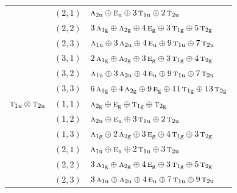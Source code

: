\documentclass[11pt]{article}
\newcommand{\irr}[1]{\text{\normalfont\scshape #1}}
\newcommand{\ptag}[1]{\mathrm{#1}}
\begin{document}
\begin{longtable}{p{} c p{}}
 & $(2,1)$ & $\irr{a}_{2\ptag{u}}\oplus \irr{e}_{\ptag{u}}\oplus 3\,\irr{t}_{1\ptag{u}}\oplus 2\,\irr{t}_{2\ptag{u}}$\\

 & $(2,2)$ & $3\,\irr{a}_{1\ptag{g}}\oplus \irr{a}_{2\ptag{g}}\oplus 4\,\irr{e}_{\ptag{g}}\oplus 3\,\irr{t}_{1\ptag{g}}\oplus 5\,\irr{t}_{2\ptag{g}}$\\

 & $(2,3)$ & $\irr{a}_{1\ptag{u}}\oplus 3\,\irr{a}_{2\ptag{u}}\oplus 4\,\irr{e}_{\ptag{u}}\oplus 9\,\irr{t}_{1\ptag{u}}\oplus 7\,\irr{t}_{2\ptag{u}}$\\

 & $(3,1)$ & $2\,\irr{a}_{1\ptag{g}}\oplus \irr{a}_{2\ptag{g}}\oplus 3\,\irr{e}_{\ptag{g}}\oplus 3\,\irr{t}_{1\ptag{g}}\oplus 4\,\irr{t}_{2\ptag{g}}$\\

 & $(3,2)$ & $\irr{a}_{1\ptag{u}}\oplus 3\,\irr{a}_{2\ptag{u}}\oplus 4\,\irr{e}_{\ptag{u}}\oplus 9\,\irr{t}_{1\ptag{u}}\oplus 7\,\irr{t}_{2\ptag{u}}$\\

 & $(3,3)$ & $6\,\irr{a}_{1\ptag{g}}\oplus 4\,\irr{a}_{2\ptag{g}}\oplus 9\,\irr{e}_{\ptag{g}}\oplus 11\,\irr{t}_{1\ptag{g}}\oplus 13\,\irr{t}_{2\ptag{g}}$\\

\hline

$\irr{t}_{1\ptag{u}}\otimes \irr{t}_{2\ptag{u}}$ & $(1,1)$ & $\irr{a}_{2\ptag{g}}\oplus \irr{e}_{\ptag{g}}\oplus \irr{t}_{1\ptag{g}}\oplus \irr{t}_{2\ptag{g}}$\\

 & $(1,2)$ & $\irr{a}_{2\ptag{u}}\oplus \irr{e}_{\ptag{u}}\oplus 3\,\irr{t}_{1\ptag{u}}\oplus 2\,\irr{t}_{2\ptag{u}}$\\

 & $(1,3)$ & $\irr{a}_{1\ptag{g}}\oplus 2\,\irr{a}_{2\ptag{g}}\oplus 3\,\irr{e}_{\ptag{g}}\oplus 4\,\irr{t}_{1\ptag{g}}\oplus 3\,\irr{t}_{2\ptag{g}}$\\

 & $(2,1)$ & $\irr{a}_{1\ptag{u}}\oplus \irr{e}_{\ptag{u}}\oplus 2\,\irr{t}_{1\ptag{u}}\oplus 3\,\irr{t}_{2\ptag{u}}$\\

 & $(2,2)$ & $3\,\irr{a}_{1\ptag{g}}\oplus \irr{a}_{2\ptag{g}}\oplus 4\,\irr{e}_{\ptag{g}}\oplus 3\,\irr{t}_{1\ptag{g}}\oplus 5\,\irr{t}_{2\ptag{g}}$\\

 & $(2,3)$ & $3\,\irr{a}_{1\ptag{u}}\oplus \irr{a}_{2\ptag{u}}\oplus 4\,\irr{e}_{\ptag{u}}\oplus 7\,\irr{t}_{1\ptag{u}}\oplus 9\,\irr{t}_{2\ptag{u}}$\\


\end{longtable}
\end{document}
